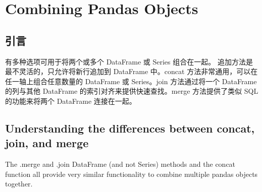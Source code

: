 \chapter{Combining Pandas Objects\label{ch11}}
\section{引言}
有多种选项可用于将两个或多个 DataFrame 或 Series 组合在一起。 追加方法是最不灵活的，只允许将新行追加到 DataFrame 中。concat 方法非常通用，可以在任一轴上组合任意数量的 DataFrame 或 Series。join 方法通过将一个 DataFrame 的列与其他 DataFrame 的索引对齐来提供快速查找。merge 方法提供了类似 SQL 的功能来将两个 DataFrame 连接在一起。
\section{Understanding the differences between concat, join, and merge}
The .merge and .join DataFrame (and not Series) methods and the concat function all provide very similar functionality to combine multiple pandas objects together.

